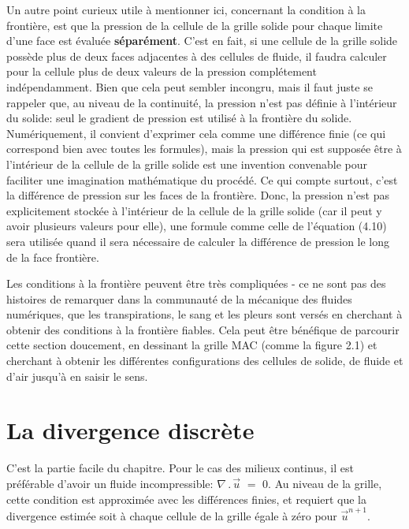 \documentclass[11pt]{report}
\begin{document}
Un autre point curieux utile à mentionner ici, concernant la condition à la frontière, est que la pression de la cellule de la grille solide pour chaque limite d'une face est évaluée \textbf{séparément}. C'est en fait, si une cellule de la grille solide possède plus de deux faces adjacentes à des cellules de fluide, il faudra calculer pour la cellule plus de deux valeurs de la pression complétement indépendamment. Bien que cela peut sembler incongru, mais il faut juste se rappeler que, au niveau de la continuité, la pression n'est pas définie à l'intérieur du solide: seul le gradient de pression est utilisé à la frontière du solide. Numériquement, il convient d'exprimer cela comme une différence finie (ce qui correspond bien avec toutes les formules), mais la pression qui est supposée être à l'intérieur de la cellule de la grille solide  est une invention convenable pour faciliter une imagination mathématique du procédé. Ce qui compte surtout, c'est la différence de pression sur les faces de la frontière. Donc, la pression n'est pas explicitement stockée à l'intérieur de la cellule de la grille solide (car il peut y avoir plusieurs valeurs pour elle), une formule comme celle de l'équation (4.10) sera utilisée quand il sera nécessaire de calculer la différence de pression le long de la face frontière. \newline

Les conditions à la frontière peuvent être très compliquées - ce ne sont pas des histoires de remarquer dans la communauté de la mécanique des fluides numériques, que les transpirations, le sang et les pleurs sont versés en cherchant à obtenir des conditions à la frontière fiables. Cela peut être bénéfique de parcourir cette section doucement, en dessinant la grille MAC (comme la figure 2.1) et cherchant à obtenir les différentes configurations des cellules de solide, de fluide et d'air jusqu'à en saisir le sens. 

\section{La divergence discrète}

C'est la partie facile du chapitre. Pour le cas des milieux continus, il est préférable d'avoir un fluide incompressible: $ \nabla \,.\, \overrightarrow{u} \,\, = \,\, 0 $. Au niveau de la grille, cette condition est approximée avec les différences finies, et requiert que la divergence estimée soit à chaque cellule de la grille égale à zéro pour $\overrightarrow{u}^{n+1}$.
\end{document}
